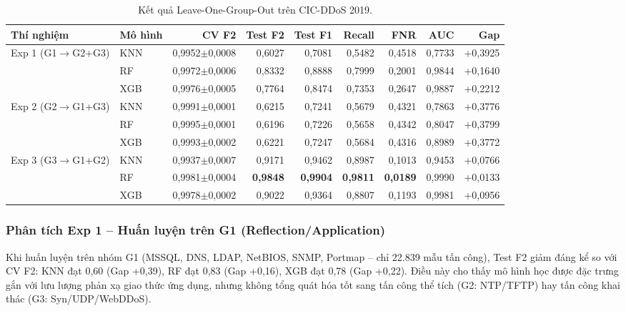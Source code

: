 \begin{table}[!t]
\caption{Kết quả Leave-One-Group-Out trên CIC-DDoS 2019.}
\label{tab:phase2_results}
\begin{center}
\begin{adjustbox}{width=\textwidth}
\begin{tabular}{|l|l|r|r|r|r|r|r|r|}
\hline
\textbf{Thí nghiệm} & \textbf{Mô hình} & \textbf{CV F2} & \textbf{Test F2} & \textbf{Test F1} & \textbf{Recall} & \textbf{FNR} & \textbf{AUC} & \textbf{Gap} \\
\hline
Exp 1 (G1$\to$G2+G3) & KNN & 0,9952$\pm$0,0008 & 0,6027 & 0,7081 & 0,5482 & 0,4518 & 0,7733 & +0,3925 \\
                      & RF  & 0,9972$\pm$0,0006 & 0,8332 & 0,8888 & 0,7999 & 0,2001 & 0,9844 & +0,1640 \\
                      & XGB & 0,9976$\pm$0,0005 & 0,7764 & 0,8474 & 0,7353 & 0,2647 & 0,9887 & +0,2212 \\
\hline
Exp 2 (G2$\to$G1+G3) & KNN & 0,9991$\pm$0,0001 & 0,6215 & 0,7241 & 0,5679 & 0,4321 & 0,7863 & +0,3776 \\
                      & RF  & 0,9995$\pm$0,0001 & 0,6196 & 0,7226 & 0,5658 & 0,4342 & 0,8047 & +0,3799 \\
                      & XGB & 0,9993$\pm$0,0002 & 0,6221 & 0,7247 & 0,5684 & 0,4316 & 0,8989 & +0,3772 \\
\hline
Exp 3 (G3$\to$G1+G2) & KNN & 0,9937$\pm$0,0007 & 0,9171 & 0,9462 & 0,8987 & 0,1013 & 0,9453 & +0,0766 \\
                      & RF  & 0,9981$\pm$0,0004 & \textbf{0,9848} & \textbf{0,9904} & \textbf{0,9811} & \textbf{0,0189} & 0,9990 & +0,0133 \\
                      & XGB & 0,9978$\pm$0,0002 & 0,9022 & 0,9364 & 0,8807 & 0,1193 & 0,9981 & +0,0956 \\
\hline
\end{tabular}
\end{adjustbox}
\end{center}
\end{table}

\subsubsection{Phân tích Exp 1 -- Huấn luyện trên G1 (Reflection/Application)}

Khi huấn luyện trên nhóm G1 (MSSQL, DNS, LDAP, NetBIOS, SNMP, Portmap -- chỉ 22.839 mẫu tấn công), Test F2 giảm đáng kể so với CV F2: KNN đạt 0,60 (Gap +0,39), RF đạt 0,83 (Gap +0,16), XGB đạt 0,78 (Gap +0,22). Điều này cho thấy mô hình học được đặc trưng gắn với lưu lượng phản xạ giao thức ứng dụng, nhưng không tổng quát hóa tốt sang tấn công thể tích (G2: NTP/TFTP) hay tấn công khai thác (G3: Syn/UDP/WebDDoS).

